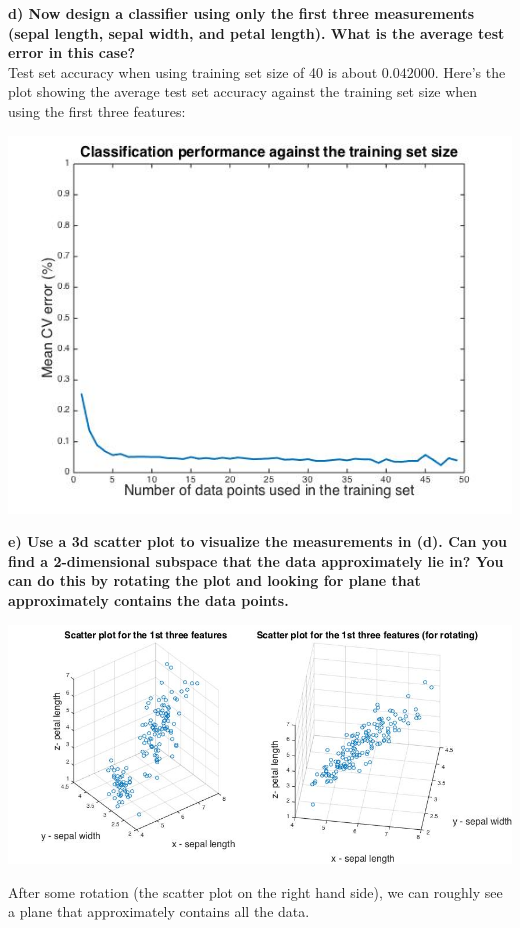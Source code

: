 \documentclass[paper=a4, fontsize=11pt]{scrartcl} %
\numberwithin{equation}{section} %
\numberwithin{figure}{section} %
\numberwithin{table}{section} %
\begin{document}
\newpage
\textbf{d) Now design a classifier using only the first three measurements (sepal length, sepal width, and petal length). What is the average test error in this case?}\\
Test set accuracy when using training set size of 40 is about $0.042000$.
Here's the plot showing the average test set accuracy against the training set size when using the first three features: 
\begin{center}
\includegraphics[scale=.5]{error_trainSize_3features.jpg}
\end{center}

\textbf{e) Use a 3d scatter plot to visualize the measurements in (d). Can you find a 2-dimensional subspace that the data approximately lie in? You can do this by rotating the plot and looking for plane that approximately contains the data points.}
\begin{center}
\includegraphics[scale=.45]{Xscatters.jpg}
\end{center}
After some rotation (the scatter plot on the right hand side), we can roughly see a plane that approximately contains all the data. 
\end{document}
